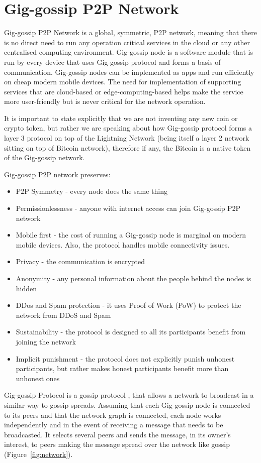 \documentclass{article}
\begin{document}
\section{Gig-gossip P2P Network}
Gig-gossip P2P Network is a global, symmetric, P2P network, meaning that there is no direct need to run any operation critical services in the cloud or any other centralised computing environment. Gig-gossip node is a software module that is run by every device that uses Gig-gossip protocol and forms a basis of communication. Gig-gossip nodes can be implemented as apps and run efficiently on cheap modern mobile devices. The need for implementation of supporting services that are cloud-based or edge-computing-based helps make the service more user-friendly but is never critical for the network operation.

It is important to state explicitly that we are not inventing any new coin or crypto token, but rather we are speaking about how Gig-gossip protocol forms a layer 3 protocol on top of the Lightning Network (being itself a layer 2 network sitting on top of Bitcoin network), therefore if any, the Bitcoin is a native token of the Gig-gossip network.

Gig-gossip P2P network preserves:
\begin{itemize}
\item P2P Symmetry - every node does the same thing
\item Permissionlessness - anyone with internet access can join Gig-gossip P2P network
\item Mobile first - the cost of running a Gig-gossip node is marginal on modern mobile devices. Also, the protocol handles mobile connectivity issues.
\item Privacy - the communication is encrypted
\item Anonymity - any personal information about the people behind the nodes is hidden
\item DDos and Spam protection - it uses Proof of Work (PoW) to protect the network from DDoS and Spam
\item Sustainability - the protocol is designed so all its participants benefit from joining the network
\item Implicit punishment - the protocol does not explicitly punish unhonest participants, but rather makes honest participants benefit more than unhonest ones
\end{itemize}

Gig-gossip Protocol is a gossip protocol \cite{Fanout}, that allows a network to broadcast in a similar way to gossip spreads. Assuming that each Gig-gossip node is connected to its peers and that the network graph is connected, each node works independently and in the event of receiving a message that needs to be broadcasted. It selects several peers and sends the message, in its owner's interest, to peers making the message spread over the network like gossip (Figure~\ref{fig:network}). 
\end{document}
